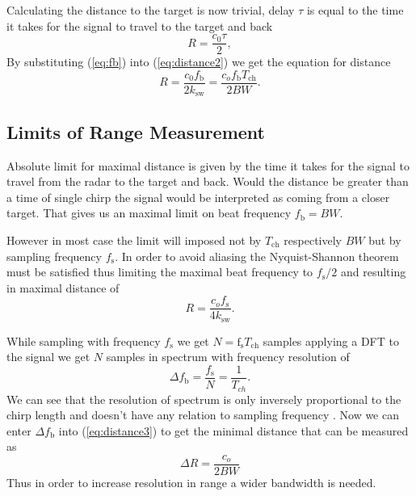 Calculating the distance to the target is now trivial, delay $\tau$ is equal to the time it takes for the signal to travel to the target and back
\begin{equation}
  R = \frac{c_0 \tau}{2},
  \label{eq:distance2}
\end{equation}
By substituting (\ref{eq:fb}) into (\ref{eq:distance2}) we get the equation for distance
\begin{equation}
  R = \frac{c_0 f_\mathrm{b}}{2k_\mathrm{sw}}= \frac{c_o f_\mathrm{b} T_{\mathrm{ch}}}{2 BW}.
  \label{eq:distance3}
\end{equation}


\subsection{Limits of Range Measurement}

Absolute limit for maximal distance is given by the time it takes for the signal to travel from the radar to the target and back.
Would the distance be greater than a time of single chirp the signal would be interpreted as coming from a closer target.
That gives us an maximal limit on beat frequency $f_\mathrm{b} = BW$.

However in most case the limit will imposed not by $T_\mathrm{ch}$ respectively $BW$ but by sampling frequency $f_\mathrm{s}$.
In order to avoid aliasing the Nyquist-Shannon theorem must be satisfied thus limiting the maximal beat frequency to $f_\mathrm{s}/2$ and resulting in maximal distance of
\begin{equation}
  R = \frac{c_o f_\mathrm{s}}{4k_\mathrm{sw}}.
  \label{eq:distance4max}
\end{equation}

While sampling with frequency $f_\mathrm{s}$ we get $N =\mathrm{f}_\mathrm{s} T_\mathrm{ch}$ samples applying a DFT to the signal we get $N$ samples in spectrum with frequency resolution of
\begin{equation}
  \Delta f_\mathrm{b} = \frac{f_\mathrm{s}}{N} = \frac{1}{T_{ch}}.
  \label{eq:resolution}
\end{equation}
We can see that the resolution of spectrum is only inversely proportional to the chirp length and doesn't have any relation to sampling frequency \cite{jankiraman2018}.
Now we can enter $\Delta f_\mathrm{b}$ into (\ref{eq:distance3}) to get the minimal distance that can be measured as
\begin{equation}
  \Delta R = \frac{c_o}{2BW}
  \label{eq:distance5min}
\end{equation}
Thus in order to increase resolution in range a wider bandwidth is needed.

